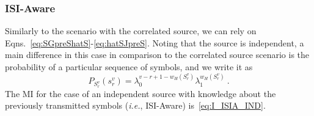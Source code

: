 \documentclass[journal]{IEEEtranTCOM}
\begin{document}
\subsubsection{ISI-Aware}
Similarly to the scenario with the correlated source, we can rely on Eqns.~\eqref{eq:SGpreShatS}-\eqref{eq:hatSJpreS}. Noting that the source is independent, a main difference in this case in comparison to the correlated source scenario is the probability of a particular sequence of symbols, and we write it as
\begin{equation}
    P_{S_{r}^{v}}(s_{r}^{v}) = \lambda_{0}^{v-r+1-w_{H}(S_{r}^{v})}\lambda_{1}^{w_{H}(S_{r}^{v})}~.\label{eq:indSrc}
\end{equation}
The MI for the case of an independent source with knowledge about the previously transmitted symbols (\textit{i.e.}, ISI-Aware) is~\eqref{eq:I_ISIA_IND}.
\end{document}
